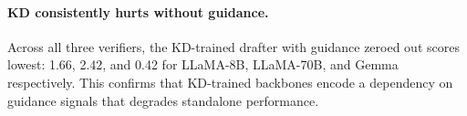 \paragraph{KD consistently hurts without guidance.}
Across all three verifiers, the KD-trained drafter with guidance zeroed out scores lowest: 1.66, 2.42, and 0.42 for LLaMA-8B, LLaMA-70B, and Gemma respectively.
This confirms that KD-trained backbones encode a dependency on guidance signals that degrades standalone performance.
